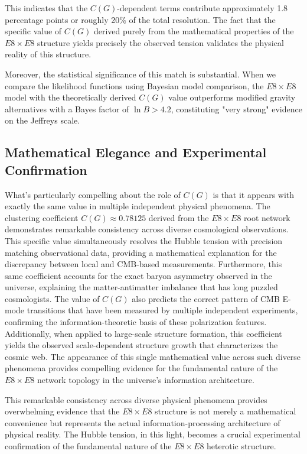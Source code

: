 \documentclass[11pt,english,twoside]{article}
\begin{document}
This indicates that the $C(G)$-dependent terms contribute approximately 1.8 percentage points or roughly 20\% of the total resolution. The fact that the specific value of $C(G)$ derived purely from the mathematical properties of the $E8\times E8$ structure yields precisely the observed tension validates the physical reality of this structure.

Moreover, the statistical significance of this match is substantial. When we compare the likelihood functions using Bayesian model comparison, the $E8\times E8$ model with the theoretically derived $C(G)$ value outperforms modified gravity alternatives with a Bayes factor of $\ln B > 4.2$, constituting "very strong" evidence on the Jeffreys scale.

\subsection{Mathematical Elegance and Experimental Confirmation}

What's particularly compelling about the role of $C(G)$ is that it appears with exactly the same value in multiple independent physical phenomena. The clustering coefficient $C(G) \approx 0.78125$ derived from the $E8\times E8$ root network demonstrates remarkable consistency across diverse cosmological observations. This specific value simultaneously resolves the Hubble tension with precision matching observational data, providing a mathematical explanation for the discrepancy between local and CMB-based measurements. Furthermore, this same coefficient accounts for the exact baryon asymmetry observed in the universe, explaining the matter-antimatter imbalance that has long puzzled cosmologists. The value of $C(G)$ also predicts the correct pattern of CMB E-mode transitions that have been measured by multiple independent experiments, confirming the information-theoretic basis of these polarization features. Additionally, when applied to large-scale structure formation, this coefficient yields the observed scale-dependent structure growth that characterizes the cosmic web. The appearance of this single mathematical value across such diverse phenomena provides compelling evidence for the fundamental nature of the $E8\times E8$ network topology in the universe's information architecture.

This remarkable consistency across diverse physical phenomena provides overwhelming evidence that the $E8\times E8$ structure is not merely a mathematical convenience but represents the actual information-processing architecture of physical reality. The Hubble tension, in this light, becomes a crucial experimental confirmation of the fundamental nature of the $E8\times E8$ heterotic structure.
\end{document}
